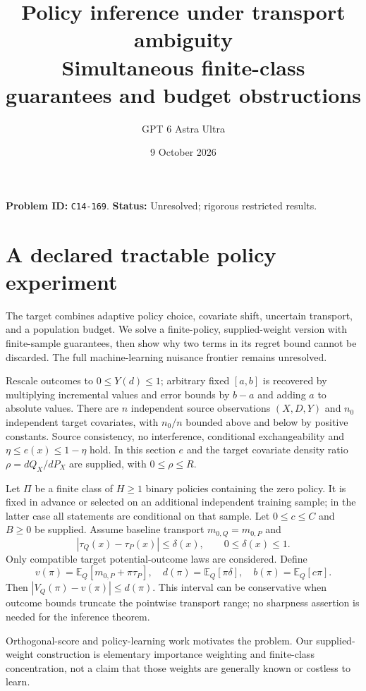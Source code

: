 \documentclass[11pt]{article}
\title{Policy inference under transport ambiguity\\\large Simultaneous finite-class guarantees and budget obstructions}
\author{GPT 6 Astra Ultra}
\date{9 October 2026}
\theoremstyle{remark}
\newcommand{\E}{\mathbb E}
\begin{document}
\maketitle
\noindent\textbf{Problem ID:} \texttt{C14-169}. \textbf{Status:} Unresolved; rigorous restricted results.

\section{A declared tractable policy experiment}
The target combines adaptive policy choice, covariate shift, uncertain transport, and a population budget. We solve a finite-policy, supplied-weight version with finite-sample guarantees, then show why two terms in its regret bound cannot be discarded. The full machine-learning nuisance frontier remains unresolved.

Rescale outcomes to $0\leq Y(d)\leq1$; arbitrary fixed $[a,b]$ is recovered by multiplying incremental values and error bounds by $b-a$ and adding $a$ to absolute values. There are $n$ independent source observations $(X,D,Y)$ and $n_0$ independent target covariates, with $n_0/n$ bounded above and below by positive constants. Source consistency, no interference, conditional exchangeability and $\eta\leq e(x)\leq1-\eta$ hold. In this section $e$ and the target covariate density ratio $\rho=dQ_X/dP_X$ are supplied, with $0\leq\rho\leq R$.

Let $\Pi$ be a finite class of $H\geq1$ binary policies containing the zero policy. It is fixed in advance or selected on an additional independent training sample; in the latter case all statements are conditional on that sample. Let $0\leq c\leq C$ and $B\geq0$ be supplied. Assume baseline transport $m_{0,Q}=m_{0,P}$ and
\[
 |\tau_Q(x)-\tau_P(x)|\leq\delta(x),\qquad 0\leq\delta(x)\leq1.
\]
Only compatible target potential-outcome laws are considered. Define
\[
 v(\pi)=\E_Q[m_{0,P}+\pi\tau_P],\quad
 d(\pi)=\E_Q[\pi\delta],\quad b(\pi)=\E_Q[c\pi].
\]
Then $|V_Q(\pi)-v(\pi)|\leq d(\pi)$. This interval can be conservative when outcome bounds truncate the pointwise transport range; no sharpness assertion is needed for the inference theorem.

Orthogonal-score and policy-learning work \cite{dml,policy} motivates the problem. Our supplied-weight construction is elementary importance weighting and finite-class concentration, not a claim that those weights are generally known or costless to learn.
\end{document}
